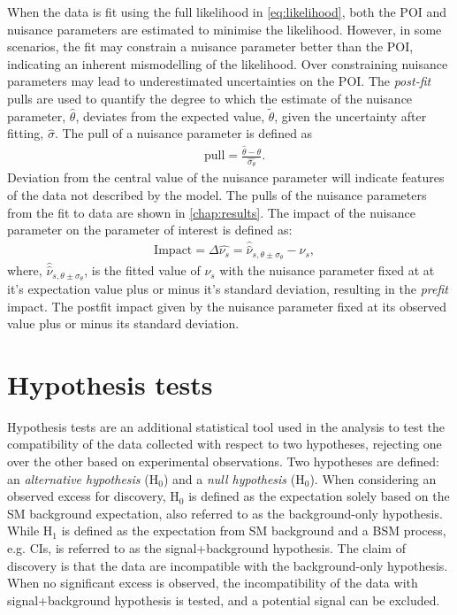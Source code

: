 When the data is fit using the full likelihood in \cref{eq:likelihood}, both the POI and nuisance parameters are estimated to minimise the likelihood. However, in some scenarios, the fit may constrain a nuisance parameter better than the POI, indicating an inherent mismodelling of the likelihood. Over constraining nuisance parameters may lead to underestimated uncertainties on the POI. The \emph{post-fit} pulls are used to quantify the degree to which the estimate of the nuisance parameter, $\hat{\theta}$, deviates from the expected value, $\tilde{\theta}$, given the uncertainty after fitting, $\hat{\sigma}$. The pull of a nuisance parameter is defined as
\begin{equation}
    \label{eq:nppull}
    \begin{aligned}
        & \mathrm{pull} = \frac{\hat{\theta} -{\theta}}{\hat{\sigma_\theta}}.
    \end{aligned}
\end{equation}
Deviation from the central value of the nuisance parameter will indicate features of the data not described by the model. The pulls of the nuisance parameters from the fit to data are shown in \cref{chap:results}. The impact of the nuisance parameter on the parameter of interest is defined as:
\begin{equation}
    \label{eq:npinpact}
    \begin{aligned}
        & \mathrm{Impact} = \Delta \hat{\nu_s} = \hat{\hat{\nu}}_{s,\theta \pm \sigma_\theta} - \hat{\nu}_s,
    \end{aligned}
\end{equation}
where, $\hat{\hat{\nu}}_{s,\theta \pm \sigma_\theta}$, is the fitted value of $\nu_s$ with the nuisance parameter fixed at at it's expectation value plus or minus it's standard deviation, resulting in the \emph{prefit} impact. The postfit impact given by the nuisance parameter fixed at its observed value plus or minus its standard deviation. 


\section{Hypothesis tests}
Hypothesis tests are an additional statistical tool used in the analysis to test the compatibility of the data collected with respect to two hypotheses, rejecting one over the other based on experimental observations. Two hypotheses are defined: an \emph{alternative hypothesis} ($\mathrm{H_0}$) and a \emph{null hypothesis} ($\mathrm{H_0}$). When considering an observed excess for discovery, $\mathrm{H_0}$ is defined as the expectation solely based on the SM background expectation, also referred to as the background-only hypothesis. While $\mathrm{H_1}$ is defined as the expectation from SM background and a BSM process, e.g. CIs, is referred to as the signal+background hypothesis. The claim of discovery is that the data are incompatible with the background-only hypothesis. When no significant excess is observed, the incompatibility of the data with signal+background hypothesis is tested, and a potential signal can be excluded. 

